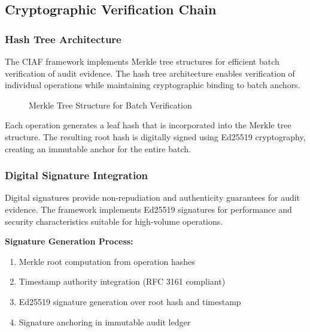 \documentclass[12pt,a4paper]{article}
\begin{document}
\subsection{Cryptographic Verification Chain}

\subsubsection{Hash Tree Architecture}

The CIAF framework implements Merkle tree structures for efficient batch verification of audit evidence. The hash tree architecture enables verification of individual operations while maintaining cryptographic binding to batch anchors.

\begin{figure}[H]
\centering
{}
\caption{Merkle Tree Structure for Batch Verification}
\label{fig:merkle}
\end{figure}

Each operation generates a leaf hash that is incorporated into the Merkle tree structure. The resulting root hash is digitally signed using Ed25519 cryptography, creating an immutable anchor for the entire batch.

\subsubsection{Digital Signature Integration}

Digital signatures provide non-repudiation and authenticity guarantees for audit evidence. The framework implements Ed25519 signatures for performance and security characteristics suitable for high-volume operations.

\textbf{Signature Generation Process:}
\begin{enumerate}
\item Merkle root computation from operation hashes
\item Timestamp authority integration (RFC 3161 compliant)
\item Ed25519 signature generation over root hash and timestamp
\item Signature anchoring in immutable audit ledger
\end{enumerate}
\end{document}
